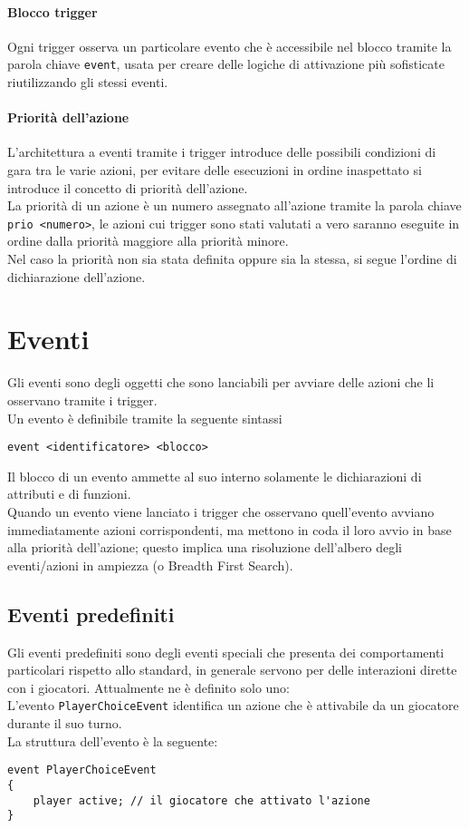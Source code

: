 \paragraph{Blocco trigger}
Ogni trigger osserva un particolare evento che è accessibile nel blocco tramite la parola chiave 
\lstinline|event|, usata per creare delle logiche di attivazione più sofisticate riutilizzando gli stessi eventi. \\

\paragraph{Priorità dell'azione}
L'architettura a eventi tramite i trigger introduce delle possibili condizioni di gara tra le varie azioni,
per evitare delle esecuzioni in ordine inaspettato si introduce il concetto di priorità dell'azione. \\
La priorità di un azione è un numero assegnato all'azione tramite la parola chiave \lstinline|prio <numero>|,
le azioni cui trigger sono stati valutati a vero saranno eseguite in ordine dalla priorità maggiore
alla priorità minore. \\
Nel caso la priorità non sia stata definita oppure sia la stessa, si segue l'ordine di dichiarazione dell'azione.

\section{Eventi}
Gli eventi sono degli oggetti che sono lanciabili per avviare delle azioni che li osservano tramite i trigger. \\
Un evento è definibile tramite la seguente sintassi
\begin{lstlisting}
event <identificatore> <blocco>
\end{lstlisting}
Il blocco di un evento ammette al suo interno solamente le dichiarazioni di attributi e di funzioni. \\
Quando un evento viene lanciato i trigger che osservano quell'evento avviano immediatamente azioni corrispondenti,
ma mettono in coda il loro avvio in base alla priorità dell'azione; questo implica
una risoluzione dell'albero degli eventi/azioni in ampiezza (o Breadth First Search).

\subsection{Eventi predefiniti}
Gli eventi predefiniti sono degli eventi speciali che presenta dei comportamenti particolari rispetto 
allo standard, in generale servono per delle interazioni dirette con i giocatori.
Attualmente ne è definito solo uno: \\
L'evento \lstinline|PlayerChoiceEvent| identifica un azione che è attivabile da un giocatore durante il suo turno. \\
La struttura dell'evento è la seguente:
\begin{lstlisting}
event PlayerChoiceEvent
{
    player active; // il giocatore che attivato l'azione
}
\end{lstlisting}


